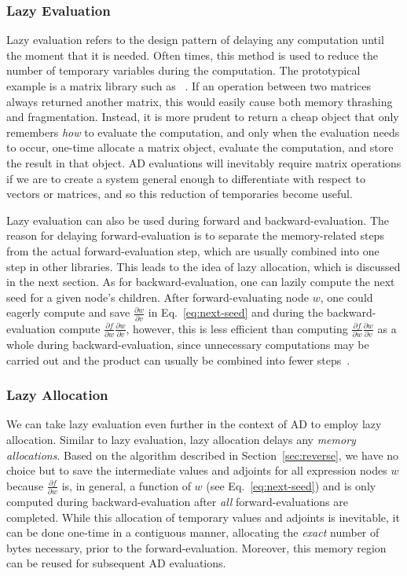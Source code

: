\subsubsection{Lazy Evaluation}\label{sssec:lazy-eval}

Lazy evaluation refers to the design pattern of delaying any computation until the moment that it is needed.
Often times, this method is used to reduce the number of temporary variables during the computation.
The prototypical example is a matrix library such as ~\cite{eigen:2010}.
If an operation between two matrices always returned another matrix, 
this would easily cause both memory thrashing and fragmentation.
Instead, it is more prudent to return a cheap object that only remembers \emph{how} to evaluate the computation,
and only when the evaluation needs to occur, one-time allocate a matrix object, 
evaluate the computation, and store the result in that object.
AD evaluations will inevitably require matrix operations if we are to create a system
general enough to differentiate with respect to vectors or matrices,
and so this reduction of temporaries become useful.

Lazy evaluation can also be used during forward and backward-evaluation.
The reason for delaying forward-evaluation is to separate
the memory-related steps from the actual forward-evaluation step,
which are usually combined into one step in other libraries.
This leads to the idea of lazy allocation, which is discussed in the next section.
As for backward-evaluation, one can lazily compute the next seed for a given node's children.
After forward-evaluating node $w$, 
one could eagerly compute and save $\frac{\partial w}{\partial v}$
in Eq.~\ref{eq:next-seed} and during the backward-evaluation 
compute $\frac{\partial f}{\partial w} \frac{\partial w}{\partial v}$,
however, this is less efficient than 
computing $\frac{\partial f}{\partial w} \frac{\partial w}{\partial v}$ as a whole
during backward-evaluation,
since unnecessary computations may be carried out
and the product can usually be combined into fewer steps~\cite{carpenter:2015}.

\subsubsection{Lazy Allocation}\label{sssec:lazy-alloc}

We can take lazy evaluation even further in the context of AD to employ lazy allocation.
Similar to lazy evaluation, lazy allocation delays any \emph{memory allocations}.
Based on the algorithm described in Section~\ref{sec:reverse},
we have no choice but to save the intermediate values and adjoints for all expression nodes $w$
because $\frac{\partial f}{\partial w}$ is, in general, a function of $w$ (see Eq.~\ref{eq:next-seed})
and is only computed during backward-evaluation after \emph{all} forward-evaluations are completed.
While this allocation of temporary values and adjoints is inevitable,
it can be done one-time in a contiguous manner, allocating the \emph{exact} number of bytes necessary,
prior to the forward-evaluation.
Moreover, this memory region can be reused for subsequent AD evaluations.

